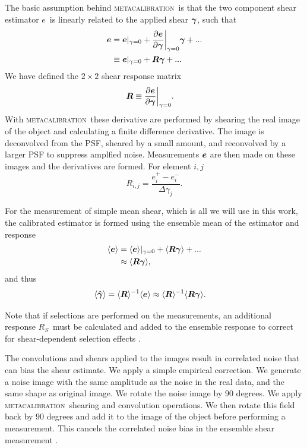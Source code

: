 \documentclass[fleqn,useAMS,usenatbib]{mnras}
\newcommand{\mcal}{\textsc{metacalibration}}
\newcommand{\vest}{\mbox{\boldmath $e$}}
\newcommand{\est}{e}
\newcommand{\mcalR}{\mbox{\boldmath $R$}}
\newcommand{\mcalRS}{\mbox{\boldmath $R_S$}}
\newcommand{\gest}{\mbox{\boldmath $\hat \gamma$}}
\newcommand{\vecgam}{\mbox{\boldmath $\gamma$}}
\begin{document}
The basic assumption behind \mcal\ is that the two component shear estimator \vest\
is linearly related to the applied shear $\vecgam$, such that
\begin{align} \label{eq:Eexpand}
    \vest &= \vest|_{\gamma=0} + \frac{ \partial \vest }{ \partial \vecgam}\bigg|_{\gamma=0} \vecgam  + ... \nonumber \\
          &\equiv \vest|_{\gamma=0} + \mbox{\mcalR}\vecgam  + ...
\end{align}
We have defined the $2 \times 2$ shear response matrix
\begin{align}
    \mbox{\mcalR} &\equiv \frac{\partial \vest}{\partial \vecgam} \bigg|_{\gamma=0}.
\end{align}
With \mcal\ these derivative are performed by shearing the real image
of the object and calculating a finite difference derivative.  The image
is deconvolved from the PSF, sheared by a small amount, and reconvolved by
a larger PSF to suppress amplfied noise.  Measurements $\vest$ are then made
on these images and the derivatives are formed. For element $i,j$
\begin{equation} \label{eq:Rnum}
    R_{i,j} = \frac{\est_i^+ - \est_i^-}{\Delta \gamma_j}.
\end{equation}

For the measurement of simple mean shear, which is all we will  use in this
work, the calibrated estimator is formed using the ensemble mean of the
estimator and response
\begin{align}
    \langle \vest \rangle &= \langle \vest \rangle |_{\gamma=0} + \langle \mbox{\mcalR} \vecgam \rangle + ... \nonumber \\
                          &\approx \langle \mbox{\mcalR} \vecgam \rangle,
\end{align}
and thus
\begin{align} \label{eq:rcorr}
    \langle \gest \rangle &= \langle \mbox{\mcalR} \rangle^{-1}  \langle \vest \rangle \approx \langle \mbox{\mcalR} \rangle^{-1} \langle \mcalR \vecgam \rangle.
\end{align}

Note that if selections are performed on the measurements, an additional
response \mcalRS\ must be calculated and added to the ensemble response
to correct for shear-dependent selection effects \citep{SheldonHuff2017}.

The convolutions and shears applied to the images result in correlated noise
that can bias the shear estimate. We apply a simple empirical correction. We
generate a noise image with the same amplitude as the noise in the real data,
and the same shape as original image.  We rotate the noise image by 90 degrees.
We apply \mcal\ shearing and convolution operations.  We then rotate this field
back by 90 degrees and add it to the image of the object before performing a
measurement. This cancels the correlated noise bias in the ensemble shear
measurement \citep{SheldonHuff2017}.
\end{document}
